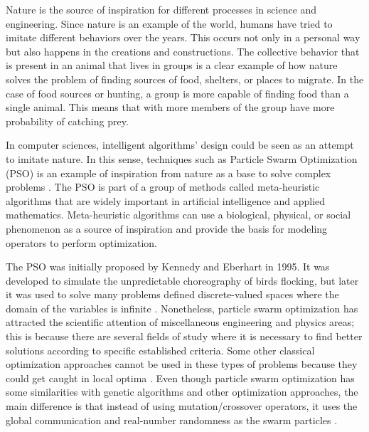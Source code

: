Nature is the source of inspiration for different processes in science and engineering. Since nature is an example of the world, humans have tried to imitate different behaviors over the years. This occurs not only in a personal way but also happens in the creations and constructions. The collective behavior that is present in an animal that lives in groups is a clear example of how nature solves the problem of finding sources of food, shelters, or places to migrate. In the case of food sources or hunting, a group is more capable of finding food than a single animal. This means that with more members of the group have more probability of catching prey. 

In computer sciences, intelligent algorithms' design could be seen as an attempt to imitate nature. In this sense, techniques such as Particle Swarm Optimization (PSO) is an example of inspiration from nature as a base to solve complex problems \cite{kennedy1995particle}. The PSO is part of a group of methods called meta-heuristic algorithms that are widely important in artificial intelligence and applied mathematics. Meta-heuristic algorithms can use a biological, physical, or social phenomenon as a source of inspiration and provide the basis for modeling operators to perform optimization.

The PSO was initially proposed by Kennedy and Eberhart in 1995. It was developed to simulate the unpredictable choreography of birds flocking, but later it was used to solve many problems defined discrete-valued spaces where the domain of the variables is infinite \cite{kennedy1995particle}. Nonetheless, particle swarm optimization has attracted the scientific attention of miscellaneous engineering and physics areas; this is because there are several fields of study where it is necessary to find better solutions according to specific established criteria. Some other classical optimization approaches cannot be used in these types of problems because they could get caught in local optima \cite{janeza2009pso}. Even though particle swarm optimization has some similarities with genetic algorithms and other optimization approaches, the main difference is that instead of using mutation/crossover operators, it uses the global communication and real-number randomness as the swarm particles \cite{yang2010nature}.

